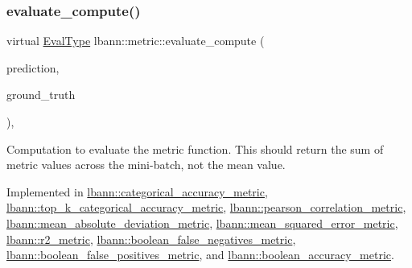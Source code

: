 \mbox{\label{classlbann_1_1metric_aab79147ff480675db2e01d7a889a4296}} 
\subsubsection{\texorpdfstring{evaluate\+\_\+compute()}{evaluate\_compute()}}
{\footnotesize\ttfamily virtual \hyperlink{base_8hpp_a3266f5ac18504bbadea983c109566867}{Eval\+Type} lbann\+::metric\+::evaluate\+\_\+compute (\begin{DoxyParamCaption}\item[{const \hyperlink{base_8hpp_a9a697a504ae84010e7439ffec862b470}{Abs\+Dist\+Mat} \&}]{prediction,  }\item[{const \hyperlink{base_8hpp_a9a697a504ae84010e7439ffec862b470}{Abs\+Dist\+Mat} \&}]{ground\+\_\+truth }\end{DoxyParamCaption})\hspace{0.3cm}{\ttfamily [protected]}, {}}

Computation to evaluate the metric function. This should return the sum of metric values across the mini-\/batch, not the mean value. 

Implemented in \hyperlink{classlbann_1_1categorical__accuracy__metric_a0ec8c3254569c9f9855675243ac51612}{lbann\+::categorical\+\_\+accuracy\+\_\+metric}, \hyperlink{classlbann_1_1top__k__categorical__accuracy__metric_a3449bdb835e7e5bd7d17cd001fb4ae38}{lbann\+::top\+\_\+k\+\_\+categorical\+\_\+accuracy\+\_\+metric}, \hyperlink{classlbann_1_1pearson__correlation__metric_a28453718aa09d609ef5ab157823d8c24}{lbann\+::pearson\+\_\+correlation\+\_\+metric}, \hyperlink{classlbann_1_1mean__absolute__deviation__metric_a4096a6f389b2f18ff6c19428313f2969}{lbann\+::mean\+\_\+absolute\+\_\+deviation\+\_\+metric}, \hyperlink{classlbann_1_1mean__squared__error__metric_a81a2aa469f965d526a489214b3e73e4f}{lbann\+::mean\+\_\+squared\+\_\+error\+\_\+metric}, \hyperlink{classlbann_1_1r2__metric_a06c84d7944d1d5be896de6b98950e05e}{lbann\+::r2\+\_\+metric}, \hyperlink{classlbann_1_1boolean__false__negatives__metric_a598dfc1ee40c4e11f001cbf8899e0e0a}{lbann\+::boolean\+\_\+false\+\_\+negatives\+\_\+metric}, \hyperlink{classlbann_1_1boolean__false__positives__metric_abb6573a4e32e97316c69ce9fc24214f0}{lbann\+::boolean\+\_\+false\+\_\+positives\+\_\+metric}, and \hyperlink{classlbann_1_1boolean__accuracy__metric_acac2d198f516990fe9b87f3abefae635}{lbann\+::boolean\+\_\+accuracy\+\_\+metric}.


